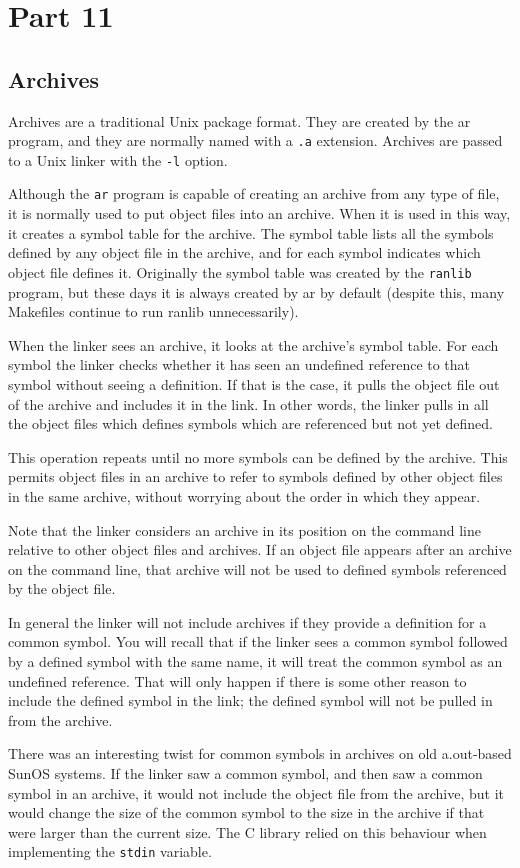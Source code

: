 \section{Part 11}

\subsection{Archives}

Archives are a traditional Unix package format. They are created by the ar
program, and they are normally named with a \texttt{.a} extension. Archives are
passed to a Unix linker with the \texttt{-l} option.

Although the \texttt{ar} program is capable of creating an archive from any
type of file, it is normally used to put object files into an archive. When
it is used in this way, it creates a symbol table for the archive. The symbol
table lists all the symbols defined by any object file in the archive, and
for each symbol indicates which object file defines it. Originally the symbol
table was created by the \texttt{ranlib} program, but these days it is always
created by ar by default (despite this, many Makefiles continue to run ranlib
unnecessarily).

When the linker sees an archive, it looks at the archive's symbol table. For
each symbol the linker checks whether it has seen an undefined reference to
that symbol without seeing a definition. If that is the case, it pulls the
object file out of the archive and includes it in the link. In other words, the
linker pulls in all the object files which defines symbols which are referenced
but not yet defined.

This operation repeats until no more symbols can be defined by the archive.
This permits object files in an archive to refer to symbols defined by other
object files in the same archive, without worrying about the order in which
they appear.

Note that the linker considers an archive in its position on the command line
relative to other object files and archives. If an object file appears after an
archive on the command line, that archive will not be used to defined symbols
referenced by the object file.

In general the linker will not include archives if they provide a definition
for a common symbol. You will recall that if the linker sees a common symbol
followed by a defined symbol with the same name, it will treat the common
symbol as an undefined reference. That will only happen if there is some other
reason to include the defined symbol in the link; the defined symbol will not
be pulled in from the archive.

There was an interesting twist for common symbols in archives on old
a.out-based SunOS systems. If the linker saw a common symbol, and then saw a
common symbol in an archive, it would not include the object file from the
archive, but it would change the size of the common symbol to the size in the
archive if that were larger than the current size. The C library relied on this
behaviour when implementing the \texttt{stdin} variable.
